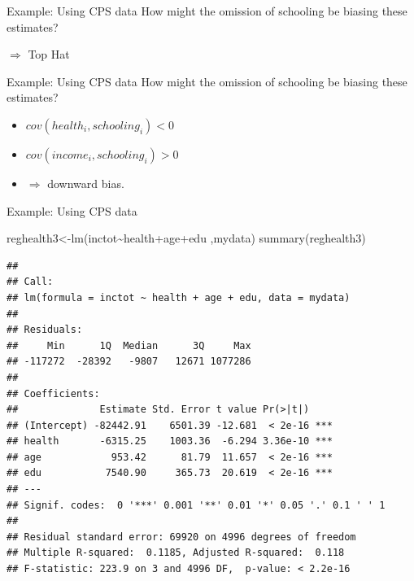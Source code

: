 \documentclass[
  ignorenonframetext,
]{beamer}
\newenvironment{Shaded}{\begin{snugshade}}{\end{snugshade}}
\newcommand{\FunctionTok}[1]{\textcolor[rgb]{0.00,0.00,0.00}{#1}}
\newcommand{\NormalTok}[1]{#1}
\newcommand{\OtherTok}[1]{\textcolor[rgb]{0.56,0.35,0.01}{#1}}
\newcommand{\SpecialCharTok}[1]{\textcolor[rgb]{0.00,0.00,0.00}{#1}}
\begin{document}
\begin{frame}{Example: Using CPS data}
\protect\hypertarget{example-using-cps-data-5}{}
How might the omission of schooling be biasing these estimates?

\(\Rightarrow\) Top Hat
\end{frame}

\begin{frame}{Example: Using CPS data}
\protect\hypertarget{example-using-cps-data-6}{}
How might the omission of schooling be biasing these estimates?

\begin{itemize}
\item
  \(cov(health_i,schooling_i)<0\)
\item
  \(cov(income_i,schooling_i)>0\)
\item
  \(\Rightarrow\) downward bias.
\end{itemize}
\end{frame}

\begin{frame}[fragile]{Example: Using CPS data}
\protect\hypertarget{example-using-cps-data-7}{}
\tiny

\begin{Shaded}
\begin{Highlighting}[]
\NormalTok{reghealth3}\OtherTok{\textless{}{-}}\FunctionTok{lm}\NormalTok{(inctot}\SpecialCharTok{\textasciitilde{}}\NormalTok{health}\SpecialCharTok{+}\NormalTok{age}\SpecialCharTok{+}\NormalTok{edu ,mydata)}
\FunctionTok{summary}\NormalTok{(reghealth3)}
\end{Highlighting}
\end{Shaded}

\begin{verbatim}
## 
## Call:
## lm(formula = inctot ~ health + age + edu, data = mydata)
## 
## Residuals:
##     Min      1Q  Median      3Q     Max 
## -117272  -28392   -9807   12671 1077286 
## 
## Coefficients:
##              Estimate Std. Error t value Pr(>|t|)    
## (Intercept) -82442.91    6501.39 -12.681  < 2e-16 ***
## health       -6315.25    1003.36  -6.294 3.36e-10 ***
## age            953.42      81.79  11.657  < 2e-16 ***
## edu           7540.90     365.73  20.619  < 2e-16 ***
## ---
## Signif. codes:  0 '***' 0.001 '**' 0.01 '*' 0.05 '.' 0.1 ' ' 1
## 
## Residual standard error: 69920 on 4996 degrees of freedom
## Multiple R-squared:  0.1185, Adjusted R-squared:  0.118 
## F-statistic: 223.9 on 3 and 4996 DF,  p-value: < 2.2e-16
\end{verbatim}

\normalsize
\end{frame}
\end{document}

